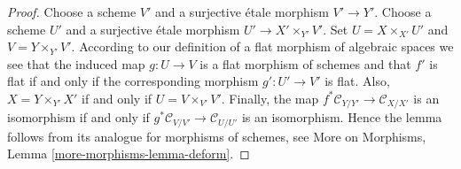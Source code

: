 \documentclass[10pt,a4paper]{amsart}
\theoremstyle{plain}
\theoremstyle{definition}
\theoremstyle{remark}
\numberwithin{equation}{subsection}
\begin{document}
\begin{proof}
Choose a scheme $V'$ and a surjective \'etale morphism $V' \to Y'$.
Choose a scheme $U'$ and a surjective \'etale morphism
$U' \to X' \times_{Y'} V'$. Set $U = X \times_{X'} U'$ and
$V = Y \times_{Y'} V'$. According to our definition of a flat morphism
of algebraic spaces we see that the induced map $g : U \to V$ is a flat
morphism of schemes and that $f'$ is flat if and only if the corresponding
morphism $g' : U' \to V'$ is flat. Also, $X = Y \times_{Y'} X'$ if and only
if $U = V \times_{V'} V'$. Finally, the map
$f^*\mathcal{C}_{Y/Y'} \to \mathcal{C}_{X/X'}$
is an isomorphism if and only if
$g^*\mathcal{C}_{V/V'} \to \mathcal{C}_{U/U'}$ is an isomorphism.
Hence the lemma follows from its analogue for morphisms of schemes, see
More on Morphisms, Lemma \ref{more-morphisms-lemma-deform}.
\end{proof}
\end{document}
